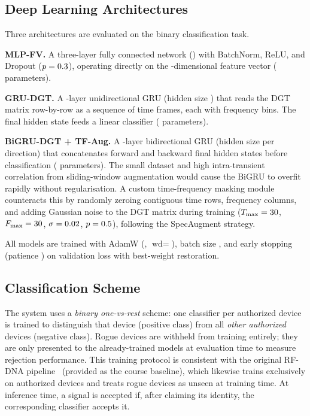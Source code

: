\subsection{Deep Learning Architectures}
Three architectures are evaluated on the binary classification task.

\textbf{MLP-FV.} A three-layer fully connected network (\mlpArch) with BatchNorm, ReLU, and Dropout ($p=0.3$), operating directly on the \fvDim-dimensional feature vector (\mlpParams{} parameters).

\textbf{GRU-DGT.} A \gruNumLayers-layer unidirectional GRU (hidden size \gruHiddenSize) that reads the DGT matrix row-by-row as a sequence of \dgtRows{} time frames, each with \dgtCols{} frequency bins. The final hidden state feeds a linear classifier (\gruParams{} parameters).

\textbf{BiGRU-DGT + TF-Aug.} A \gruNumLayers-layer bidirectional GRU (hidden size \gruHiddenSize{} per direction) that concatenates forward and backward final hidden states before classification (\bigruParams{} parameters). The small dataset and high intra-transient correlation from sliding-window augmentation would cause the BiGRU to overfit rapidly without regularisation. A custom time-frequency masking module counteracts this by randomly zeroing contiguous time rows, frequency columns, and adding Gaussian noise to the DGT matrix during training
($T_{\max}=30$, $F_{\max}=30$, $\sigma=0.02$, $p=0.5$), following the SpecAugment strategy.

All models are trained with AdamW (\trainLR, $\text{wd}=$\trainWD), batch size \trainBatch, and early stopping (patience \trainPatience) on validation loss with best-weight restoration.

\subsection{Classification Scheme}
The system uses a \emph{binary one-vs-rest} scheme: one classifier per authorized device is trained to distinguish that device (positive class) from all \emph{other authorized} devices (negative class). Rogue devices are withheld from training entirely; they are only presented to the already-trained models at evaluation time to measure rejection performance. This training protocol is consistent with the original RF-DNA pipeline~\cite{alla2024pla} (provided as the course baseline), which likewise trains exclusively on authorized devices and treats rogue devices as unseen at training time. At inference time, a signal is accepted if, after claiming its identity, the corresponding classifier accepts it.

